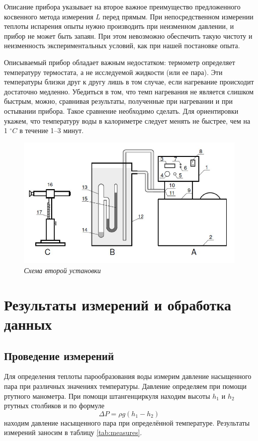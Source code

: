 \documentclass[12pt,a4paper]{article}
\begin{document}
Описание прибора указывает на второе важное преимущество предложенного косвенного метода измерения $ L $ перед прямым. При непосредственном измерении теплоты испарения опыты нужно производить при неизменном давлении, и прибор не может быть запаян. При этом невозможно обеспечить такую чистоту и неизменность экспериментальных условий, как при нашей постановке опыта.

Описываемый прибор обладает важным недостатком: термометр определяет температуру термостата, а не исследуемой жидкости (или ее пара). Эти температуры близки друг к другу лишь в том случае, если нагревание происходит достаточно медленно. Убедиться в том, что темп нагревания не является слишком быстрым, можно, сравнивая результаты, полученные при нагревании и при остывании прибора. Такое сравнение необходимо сделать. Для ориентировки укажем, что температуру воды в калориметре следует менять не быстрее, чем на 1 $ ^\circ C $ в течение 1–3 минут.

\begin{figure}[H]
\begin{center}
		\includegraphics[width=15cm]{2.4.1_2}
\end{center}
	\caption{\textit{Схема второй установки}}
	\label{img2}
\end{figure}

\section{Результаты измерений и обработка данных}

\subsection{Проведение измерений}

Для определения теплоты парообразования воды измерим давление насыщенного пара при различных значениях температуры. Давление определяем при помощи ртутного манометра. При помощи штангенциркуля находим высоты $ h_1 $ и $ h_2 $ ртутных столбиков и по формуле  \begin{equation}\label{P}
\Delta P = \rho g (h_1 - h_2)
\end{equation}  находим давление насыщенного пара при определённой температуре. Результаты измерений заносим в таблицу \ref{tab:measures}.
\end{document}

